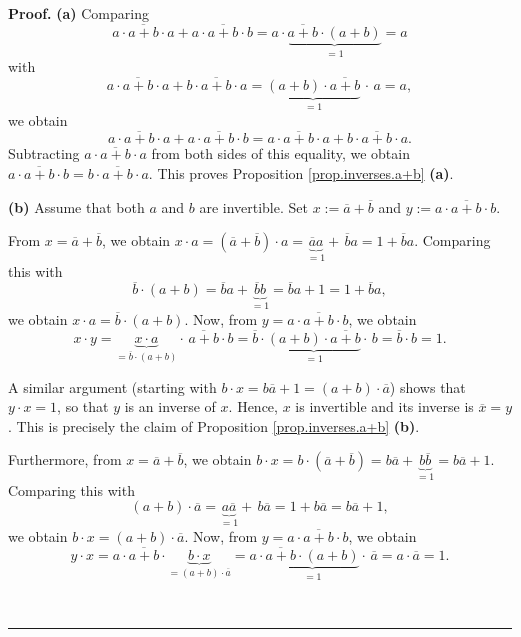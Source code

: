 \documentclass[numbers=enddot,12pt,final,onecolumn,notitlepage]{scrartcl}%
\theoremstyle{definition}
\newenvironment{verlong}{}{}
\newenvironment{vershort}{}{}
\newenvironment{proof}[1][Proof]{\noindent\textbf{#1.} }{\ \rule{0.5em}{0.5em}}
\begin{document}
\begin{proof}
\textbf{(a)} Comparing
\[
a\cdot\overline{a+b}\cdot a+a\cdot\overline{a+b}\cdot b=a\cdot
\underbrace{\overline{a+b}\cdot\left(  a+b\right)  }_{=1}=a
\]
with%
\[
a\cdot\overline{a+b}\cdot a+b\cdot\overline{a+b}\cdot a=\underbrace{\left(
a+b\right)  \cdot\overline{a+b}}_{=1}\, \cdot\, a=a,
\]
we obtain%
\[
a\cdot\overline{a+b}\cdot a+a\cdot\overline{a+b}\cdot b=a\cdot\overline
{a+b}\cdot a+b\cdot\overline{a+b}\cdot a.
\]
Subtracting $a\cdot\overline{a+b}\cdot a$ from both sides of this equality, we
obtain $a\cdot\overline{a+b}\cdot b=b\cdot\overline{a+b}\cdot a$. This proves
Proposition \ref{prop.inverses.a+b} \textbf{(a)}. \medskip



\textbf{(b)} Assume that both $a$ and $b$ are invertible. Set $x:=\overline
{a}+\overline{b}$ and $y:=a\cdot\overline{a+b}\cdot b$.

From $x=\overline{a}+\overline{b}$, we obtain $x\cdot a=\left(  \overline
{a}+\overline{b}\right)  \cdot a=\underbrace{\overline{a}a}_{=1}%
+\,\overline{b}a=1+\overline{b}a$. Comparing this with%
\[
\overline{b}\cdot\left(  a+b\right)  =\overline{b}a+\underbrace{\overline{b}%
b}_{=1}=\overline{b}a+1=1+\overline{b}a,
\]
we obtain $x\cdot a=\overline{b}\cdot\left(  a+b\right)  $. Now, from
$y=a\cdot\overline{a+b}\cdot b$, we obtain%
\[
x\cdot y=\underbrace{x\cdot a}_{=\overline{b}\cdot\left(  a+b\right)  }\cdot\,
\overline{a+b}\cdot b=\overline{b}\cdot\underbrace{\left(  a+b\right)
\cdot\overline{a+b}}_{=1}\cdot\, b=\overline{b}\cdot b=1.
\]


\begin{vershort}
A similar argument (starting with $b \cdot x = b \overline{a} + 1 = \left(  a
+ b\right)  \cdot\overline{a}$) shows that $y\cdot x = 1$, so that $y$ is an
inverse of $x$. Hence, $x$ is invertible and its inverse is $\overline{x} =
y$. This is precisely the claim of Proposition \ref{prop.inverses.a+b}
\textbf{(b)}. \qedhere

\end{vershort}



\begin{verlong}
Furthermore, from $x=\overline{a}+\overline{b}$, we obtain $b\cdot
x=b\cdot\left(  \overline{a}+\overline{b}\right)  =b\overline{a}%
+\underbrace{b\overline{b}}_{=1}=b\overline{a}+1$. Comparing this with%
\[
\left(  a+b\right)  \cdot\overline{a}=\underbrace{a\overline{a}}_{=1}+\,
b\overline{a}=1+b\overline{a}=b\overline{a}+1,
\]
we obtain $b\cdot x=\left(  a+b\right)  \cdot\overline{a}$. Now, from
$y=a\cdot\overline{a+b}\cdot b$, we obtain%
\[
y\cdot x=a\cdot\overline{a+b}\cdot\underbrace{b\cdot x}_{=\left(  a+b\right)
\cdot\overline{a}}=a\cdot\underbrace{\overline{a+b}\cdot\left(  a+b\right)
}_{=1}\cdot\, \overline{a}=a\cdot\overline{a}=1.
\]



\end{verlong}
\end{proof}
\end{document}
